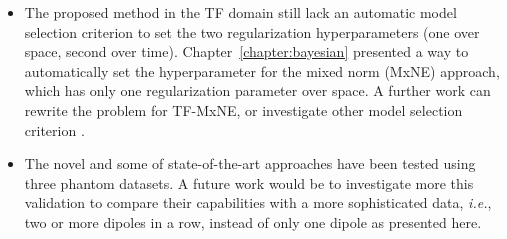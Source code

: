 \begin{itemize}
\item The proposed method in the TF domain still lack an automatic model selection criterion to set the two regularization hyperparameters (one over space, second over time). Chapter~\ref{chapter:bayesian} presented a way to automatically set the hyperparameter for the mixed norm (MxNE) approach, which has only one regularization parameter over space. A further work can rewrite the problem for TF-MxNE, or investigate other model selection criterion .

\item The novel and some of state-of-the-art approaches have been tested using three phantom datasets. A future work would be to investigate more this validation to compare their capabilities with a more sophisticated data, \textit{i.e.}, two or more dipoles in a row, instead of only one dipole as presented here.
\end{itemize} 

